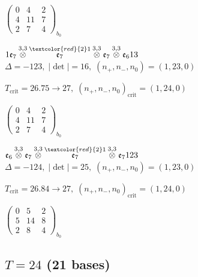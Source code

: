 \documentclass[10pt]{article}
\begin{document}
\hspace{2em}$\left(\begin{smallmatrix}0 & 4 & 2 \\ 4 & 11 & 7 \\ 2 & 7 & 4\end{smallmatrix}\right)_{\!b_0}$

\smallskip

$1\mathfrak{e}_7\overset{3,3}{\otimes}\overset{\textcolor{red}{2}1}{\mathfrak{e}_7}\overset{3,3}{\otimes}\mathfrak{e}_7\overset{3,3}{\otimes}\mathfrak{e}_613$ \quad $\Delta=-123,\; |\det|=16,\; (n_+,n_-,n_0)=(1,23,0)$

\hspace{1em}$T_{\text{crit}}=26.75 \to 27,\; (n_+,n_-,n_0)_{\text{crit}}=(1,24,0)$

\hspace{2em}$\left(\begin{smallmatrix}0 & 4 & 2 \\ 4 & 11 & 7 \\ 2 & 7 & 4\end{smallmatrix}\right)_{\!b_0}$

\smallskip

$\mathfrak{e}_6\overset{3,3}{\otimes}\mathfrak{e}_7\overset{3,3}{\otimes}\overset{\textcolor{red}{2}1}{\mathfrak{e}_7}\overset{3,3}{\otimes}\mathfrak{e}_7123$ \quad $\Delta=-124,\; |\det|=25,\; (n_+,n_-,n_0)=(1,23,0)$

\hspace{1em}$T_{\text{crit}}=26.84 \to 27,\; (n_+,n_-,n_0)_{\text{crit}}=(1,24,0)$

\hspace{2em}$\left(\begin{smallmatrix}0 & 5 & 2 \\ 5 & 14 & 8 \\ 2 & 8 & 4\end{smallmatrix}\right)_{\!b_0}$


\subsection*{$T = 24$ \quad (21 bases)}
\smallskip
\end{document}
